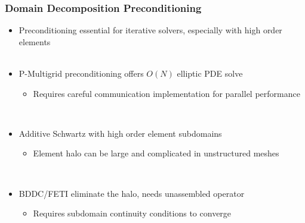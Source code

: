 \documentclass{beamer}
\begin{document}
\begin{frame}
\begin{center}
\frametitle{Domain Decomposition Preconditioning}

\begin{itemize}

\item Preconditioning essential for iterative solvers, especially with high
order elements\\

~\\

\item P-Multigrid preconditioning offers $O(N)$ elliptic PDE solve\\

\begin{itemize}

\item Requires careful communication implementation for parallel performance

\end{itemize}

~\\

\item Additive Schwartz with high order element subdomains

\begin{itemize}

\item Element halo can be large and complicated in unstructured meshes

\end{itemize}

~\\

\item BDDC/FETI eliminate the halo, needs unassembled operator

\begin{itemize}

\item Requires subdomain continuity conditions to converge

\end{itemize}

\end{itemize}

\end{center}
\end{frame}

\end{document}
